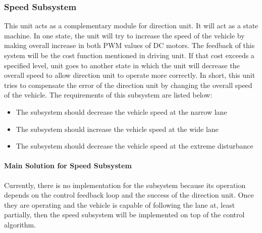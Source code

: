 \documentclass[a4paper,12pt]{article}
\begin{document}
	
	\subsubsection{Speed Subsystem}
	
	This unit acts as a complementary module for direction unit. It will act as a state machine. In one state, the unit will try to increase the speed of the vehicle by making overall increase in both PWM values of DC motors. The feedback of this  system will be the cost function mentioned in driving unit. If that cost exceeds a specified level, unit goes to another state in which the unit will decrease the overall speed to allow direction unit to operate more correctly. In short, this unit tries to compensate the error of the direction unit by changing the overall speed of the vehicle. The requirements of this subsystem are listed below:
	\begin{itemize}
		\item The subsystem should decrease the vehicle speed at the narrow lane 
		\item The subsystem should increase the vehicle speed at the wide lane 
		\item The subsystem should decrease the vehicle speed at the extreme disturbance  
	\end{itemize}
	
	\paragraph{Main Solution for Speed Subsystem}
	Currently, there is no implementation for the subsystem because its operation depends on the control feedback loop and the success of the direction unit. Once they are operating and the vehicle is capable of following the lane at, least partially, then the speed subsystem will be implemented on top of the control algorithm.\\
	
\end{document}
